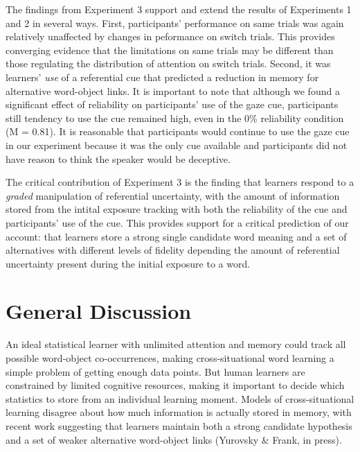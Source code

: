 \documentclass[a4paper,man,natbib]{apa6}
\begin{document}
The findings from Experiment 3 support and extend the results of
Experiments 1 and 2 in several ways. First, participants' performance on
same trials was again relatively unaffected by changes in peformance on
switch trials. This provides converging evidence that the limitations on
same trials may be different than those regulating the distribution of
attention on switch trials. Second, it was learners' \emph{use} of a
referential cue that predicted a reduction in memory for alternative
word-object links. It is important to note that although we found a
significant effect of reliability on participants' use of the gaze cue,
participants still tendency to use the cue remained high, even in the
0\% reliability condition (M = 0.81). It is reasonable that participants
would continue to use the gaze cue in our experiment because it was the
only cue available and participants did not have reason to think the
speaker would be deceptive.

The critical contribution of Experiment 3 is the finding that learners
respond to a \emph{graded} manipulation of referential uncertainty, with
the amount of information stored from the intital exposure tracking with
both the reliability of the cue and participants' use of the cue. This
provides support for a critical prediction of our account: that learners
store a strong single candidate word meaning and a set of alternatives
with different levels of fidelity depending the amount of referential
uncertainty present during the initial exposure to a word.

\section{General Discussion}\label{general-discussion}

An ideal statistical learner with unlimited attention and memory could
track all possible word-object co-occurrences, making cross-situational
word learning a simple problem of getting enough data points. But human
learners are constrained by limited cognitive resources, making it
important to decide which statistics to store from an individual
learning moment. Models of cross-situational learning disagree about how
much information is actually stored in memory, with recent work
suggesting that learners maintain both a strong candidate hypothesis and
a set of weaker alternative word-object links (Yurovsky \& Frank, in
press).
\end{document}
